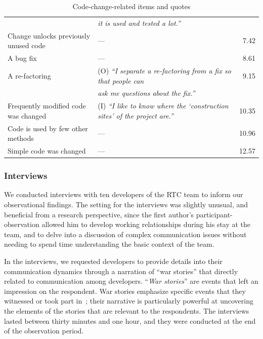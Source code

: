 \begin{table}
\begin{tabular}{l@{\hspace{-10pt}}l@{\hspace{-20pt}}r}
&\emph{it is used and tested a lot.''}&\\
Change unlocks previously unused code &--- & 7.42\\%
A bug fix &--- & 8.61\\%
A re-factoring &(O) \emph{``I separate a re-factoring from a fix so that people can }& 9.15\\%
&\emph{ask me questions about the fix.''}&\\
Frequently modified code was changed &(I) \emph{``I like to know where the `construction sites' of the project are.''}& 10.35\\%
Code is used by few other methods &--- & 10.96\\%
Simple code was changed\phantom{abcdefgheabcdefghe} &--- & 12.57\\%
\bottomrule
\end{tabular}
\label{tab:sub-technical}
\caption{Code-change-related items and quotes}
\label{tab:surveyfactors}
\end{table}

\subsubsection{Interviews}
We conducted interviews with ten developers of the RTC team to inform our observational findings. The setting for the interviews was slightly unusual, and beneficial from a research perspective, since the first author's participant-observation allowed him to develop working relationships during his stay at the team, and to delve into a discussion of complex communication issues without needing to spend time understanding the basic context of the team.

In the interviews, we requested developers to provide details into their communication dynamics through a narration of ``war stories'' that directly related to communication among developers. ``\emph{War stories}'' are events that left an impression on the respondent. War stories emphasize specific events that they witnessed or took part in~\cite{lutters:ist:2007}; their narrative is particularly powerful at uncovering the elements of the stories that are relevant to the respondents. The interviews lasted between thirty minutes and one hour, and they were conducted at the end of the observation period. 


